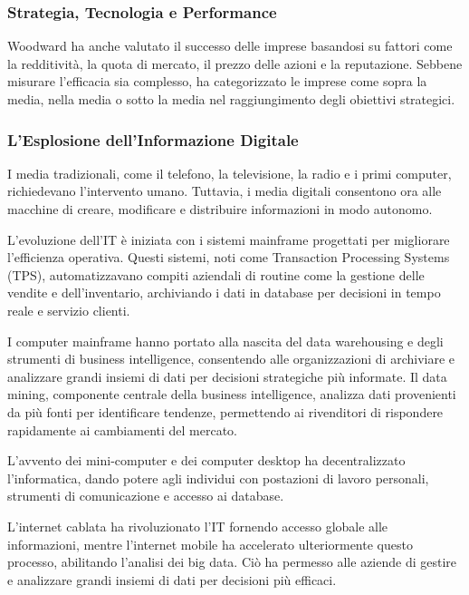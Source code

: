 \documentclass{article}
\begin{document}
\subsubsection{Strategia, Tecnologia e Performance}

Woodward ha anche valutato il successo delle imprese basandosi su fattori come la redditività, la quota di mercato, il prezzo delle azioni e la reputazione. Sebbene misurare l'efficacia sia complesso, ha categorizzato le imprese come sopra la media, nella media o sotto la media nel raggiungimento degli obiettivi strategici.

\subsubsection{L'Esplosione dell'Informazione Digitale}

I media tradizionali, come il telefono, la televisione, la radio e i primi computer, richiedevano l'intervento umano. Tuttavia, i media digitali consentono ora alle macchine di creare, modificare e distribuire informazioni in modo autonomo.

L'evoluzione dell'IT è iniziata con i sistemi mainframe progettati per migliorare l'efficienza operativa. Questi sistemi, noti come Transaction Processing Systems (TPS), automatizzavano compiti aziendali di routine come la gestione delle vendite e dell'inventario, archiviando i dati in database per decisioni in tempo reale e servizio clienti.

I computer mainframe hanno portato alla nascita del data warehousing e degli strumenti di business intelligence, consentendo alle organizzazioni di archiviare e analizzare grandi insiemi di dati per decisioni strategiche più informate. Il data mining, componente centrale della business intelligence, analizza dati provenienti da più fonti per identificare tendenze, permettendo ai rivenditori di rispondere rapidamente ai cambiamenti del mercato.

L'avvento dei mini-computer e dei computer desktop ha decentralizzato l'informatica, dando potere agli individui con postazioni di lavoro personali, strumenti di comunicazione e accesso ai database.

L'internet cablata ha rivoluzionato l'IT fornendo accesso globale alle informazioni, mentre l'internet mobile ha accelerato ulteriormente questo processo, abilitando l'analisi dei big data. Ciò ha permesso alle aziende di gestire e analizzare grandi insiemi di dati per decisioni più efficaci.
\end{document}
